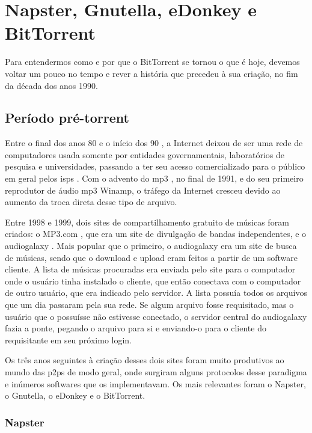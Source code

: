 
\chapter{Napster, Gnutella, eDonkey e BitTorrent}

Para entendermos como e por que o BitTorrent se tornou o que é hoje, devemos voltar um
pouco no tempo e rever a história que precedeu à sua criação, no fim da década dos anos
1990.

\section{Período pré-torrent}

Entre o final dos anos 80 e o início dos 90 \cite{wiki:fs,wiki:fs-timeline}, a
Internet deixou de ser uma rede de computadores usada somente por entidades
governamentais, laboratórios de pesquisa e universidades, passando a ter seu acesso
comercializado para o público em geral pelos \glspl{isp} \cite{wiki:isp}. Com o
advento do \gls{mp3} \cite{wiki:mp3}, no final de 1991, e do seu primeiro reprodutor
de áudio \gls*{mp3} Winamp, o tráfego da Internet cresceu devido ao aumento da troca
direta desse tipo de arquivo.

Entre 1998 e 1999, dois sites de compartilhamento gratuito de músicas foram criados: o
MP3.com \cite{wiki:mp3.com}, que era um site de divulgação de bandas independentes,
e o \gls{audiogalaxy} \cite{wiki:audiogalaxy.com,revista:pnp}. Mais popular que o
primeiro, o \gls*{audiogalaxy} era um site de busca de músicas, sendo que o download e
upload eram feitos a partir de um software cliente. A lista de músicas procuradas era
enviada pelo site para o computador onde o usuário tinha instalado o cliente, que então
conectava com o computador de outro usuário, que era indicado pelo servidor. A lista
possuía todos os arquivos que um dia passaram pela sua rede. Se algum arquivo fosse
requisitado, mas o usuário que o possuísse não estivesse conectado, o servidor central
do \gls*{audiogalaxy} fazia a ponte, pegando o arquivo para si e enviando-o para o
cliente do requisitante em seu próximo login.

Os três anos seguintes à criação desses dois sites foram muito produtivos ao mundo das
\glspl{p2p} de modo geral, onde surgiram alguns protocolos desse paradigma e inúmeros
softwares que os implementavam. Os mais relevantes foram o Napster, o Gnutella, o
eDonkey e o BitTorrent.

\subsection*{Napster}

